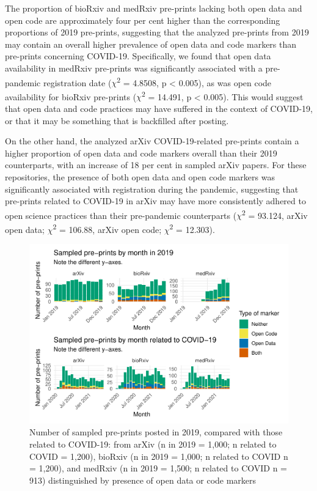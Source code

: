 \documentclass[
]{article}
\begin{document}
The proportion of bioRxiv and medRxiv pre-prints lacking both open data and open code are approximately four per cent higher than the corresponding proportions of 2019 pre-prints, suggesting that the analyzed pre-prints from 2019 may contain an overall higher prevalence of open data and code markers than pre-prints concerning COVID-19. Specifically, we found that open data availability in medRxiv pre-prints was significantly associated with a pre-pandemic registration date (\(\chi\)\textsuperscript{2} = 4.8508, p \textless{} 0.005), as was open code availability for bioRxiv pre-prints (\(\chi\)\textsuperscript{2} = 14.491, p \textless{} 0.005). This would suggest that open data and code practices may have suffered in the context of COVID-19, or that it may be something that is backfilled after posting.

On the other hand, the analyzed arXiv COVID-19-related pre-prints contain a higher proportion of open data and code markers overall than their 2019 counterparts, with an increase of 18 per cent in sampled arXiv papers. For these repositories, the presence of both open data and open code markers was significantly associated with registration during the pandemic, suggesting that pre-prints related to COVID-19 in arXiv may have more consistently adhered to open science practices than their pre-pandemic counterparts (\(\chi\)\textsuperscript{2} = 93.124, arXiv open data; \(\chi\)\textsuperscript{2} = 106.88, arXiv open code; \(\chi\)\textsuperscript{2} = 12.303).

\begin{figure}

{\centering \includegraphics[width=0.9\linewidth]{paper_files/figure-latex/arxiv-and-monthly-papers-condition-stack-1} 

}

\caption{Number of sampled pre-prints posted in 2019, compared with those related to COVID-19: from arXiv (n in 2019 = 1,000; n related to COVID = 1,200), bioRxiv (n in 2019 = 1,000; n related to COVID n = 1,200), and medRxiv (n in 2019 = 1,500; n related to COVID n = 913) distinguished by presence of open data or code markers}\label{fig:arxiv-and-monthly-papers-condition-stack}
\end{figure}
\end{document}
